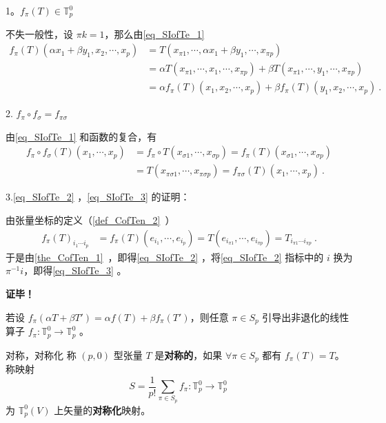 1。$f_\pi(T)\in\mathbb{T}_p^0$

不失一般性，设 $\pi k=1$，那么由\autoref{eq_SIofTe_1} 
\begin{equation}
\begin{aligned}
f_\pi(T)(\alpha x_1+\beta y_1,x_2,\cdots,x_p)&=T(x_{\pi1},\cdots,\alpha x_1+\beta y_1,\cdots,x_{\pi p})\\
&=\alpha T(x_{\pi1},\cdots,x_1,\cdots,x_{\pi p})+\beta T(x_{\pi1},\cdots,y_1,\cdots,x_{\pi p})\\
&=\alpha f_{\pi}(T)(x_1,x_2,\cdots,x_p)+\beta f_{\pi}(T)(y_1,x_2,\cdots,x_p)~.
\end{aligned}
\end{equation}

2. $f_\pi \circ f_\sigma=f_{\pi\sigma}$

由\autoref{eq_SIofTe_1} 和函数的复合，有
\begin{equation}
\begin{aligned}
f_\pi\circ f_\sigma(T)(x_1,\cdots,x_p)&=f_\pi\circ T(x_{\sigma1},\cdots,x_{\sigma p})=f_\pi(T)(x_{\sigma1},\cdots,x_{\sigma p})\\
&=T(x_{\pi\sigma1},\cdots,x_{\pi\sigma p})=f_{\pi\sigma}(T)(x_1,\cdots,x_p)~.
\end{aligned}
\end{equation}


3.\autoref{eq_SIofTe_2} ，\autoref{eq_SIofTe_3} 的证明：

由张量坐标的定义（\autoref{def_CofTen_2}~）
\begin{equation}
\begin{aligned}
f_{\pi}(T)_{i_1\cdots i_p}&=f_{\pi}(T)(e_{i_1},\cdots,e_{i_p})=T(e_{i_{\pi1}},\cdots,e_{i_{\pi p}})=T_{i_{\pi1}\cdots i_{\pi p}}~.
\end{aligned}
\end{equation}
于是由\autoref{the_CofTen_1}~，即得\autoref{eq_SIofTe_2} ，将\autoref{eq_SIofTe_2} 指标中的 $i$ 换为  $\pi^{-1} i$，即得\autoref{eq_SIofTe_3} 。

\textbf{证毕！}

若设 $f_\pi(\alpha T+\beta T')=\alpha f(T)+\beta f_\pi(T')$，则任意 $\pi \in S_p$ 引导出非退化的线性算子 $f_\pi:\mathbb{T}_p^0\rightarrow\mathbb{T}_p^0$ 。

\begin{definition}{对称，对称化}
称 $(p,0)$ 型张量 $T$ 是\textbf{对称的}，如果 $\forall \pi\in S_p$ 都有 $f_{\pi}(T)=T$。称映射 
\begin{equation}
S=\frac{1}{p!}\sum_{\pi\in S_p} f_\pi:\mathbb{T}_p^0\rightarrow\mathbb{T}_p^0~
\end{equation}
为 $\mathbb{T}_p^0(V)$ 上矢量的\textbf{对称化}映射。
\end{definition}


